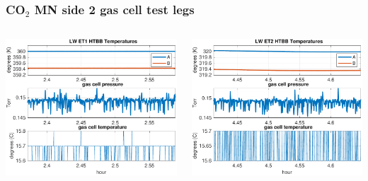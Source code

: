 \documentclass[9pt]{beamer}
\begin{document}
\begin{frame}
\frametitle{CO$_2$ MN side 2 gas cell test legs}

\begin{columns}[t]
\begin{column}{0.45\textwidth}
  \begin{centering}
  \includegraphics[width=\textwidth]{harvest_02-05/02-05_LW_ET1.pdf}
  \end{centering}
\end{column}
\begin{column}{0.45\textwidth}  
  \begin{centering}
  \includegraphics[width=\textwidth]{harvest_02-05/02-05_LW_ET2.pdf}
  \end{centering}
\end{column}
\end{columns}
\vspace{3mm}


\end{frame}
\end{document}
